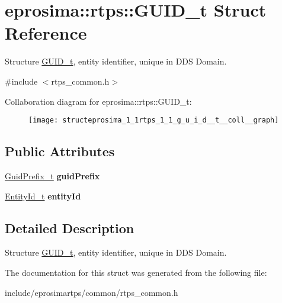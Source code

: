 \hypertarget{structeprosima_1_1rtps_1_1_g_u_i_d__t}{\section{eprosima\-:\-:rtps\-:\-:\-G\-U\-I\-D\-\_\-t \-Struct \-Reference}
\label{structeprosima_1_1rtps_1_1_g_u_i_d__t}
}


\-Structure \hyperlink{structeprosima_1_1rtps_1_1_g_u_i_d__t}{\-G\-U\-I\-D\-\_\-t}, entity identifier, unique in \-D\-D\-S \-Domain.  




{\ttfamily \#include $<$rtps\-\_\-common.\-h$>$}



\-Collaboration diagram for eprosima\-:\-:rtps\-:\-:\-G\-U\-I\-D\-\_\-t\-:\nopagebreak
\begin{figure}[H]
\begin{center}
\leavevmode
\texttt{[image: structeprosima\_1\_1rtps\_1\_1\_g\_u\_i\_d\_\_t\_\_coll\_\_graph]}
\end{center}
\end{figure}
\subsection*{\-Public \-Attributes}
\begin{DoxyCompactItemize}
\item 
\hypertarget{structeprosima_1_1rtps_1_1_g_u_i_d__t_a158112e3c2dee6dedee7e91310e1feaf}{\hyperlink{structeprosima_1_1rtps_1_1_guid_prefix__t}{\-Guid\-Prefix\-\_\-t} {\bfseries guid\-Prefix}}\label{structeprosima_1_1rtps_1_1_g_u_i_d__t_a158112e3c2dee6dedee7e91310e1feaf}

\item 
\hypertarget{structeprosima_1_1rtps_1_1_g_u_i_d__t_a23b039972057c12fdd914d23e88bd74b}{\hyperlink{structeprosima_1_1rtps_1_1_entity_id__t}{\-Entity\-Id\-\_\-t} {\bfseries entity\-Id}}\label{structeprosima_1_1rtps_1_1_g_u_i_d__t_a23b039972057c12fdd914d23e88bd74b}

\end{DoxyCompactItemize}


\subsection{\-Detailed \-Description}
\-Structure \hyperlink{structeprosima_1_1rtps_1_1_g_u_i_d__t}{\-G\-U\-I\-D\-\_\-t}, entity identifier, unique in \-D\-D\-S \-Domain. 

\-The documentation for this struct was generated from the following file\-:\begin{DoxyCompactItemize}
\item 
include/eprosimartps/common/rtps\-\_\-common.\-h\end{DoxyCompactItemize}

